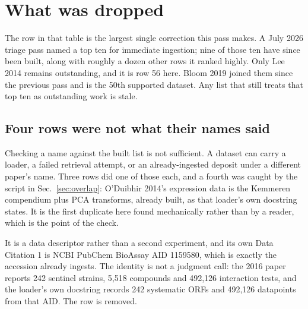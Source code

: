 
\section{What was dropped}\label{sec:excluded}



The  row in that table is the largest single correction this pass
makes. A July 2026 triage pass named a top ten for immediate ingestion; nine of those ten
have since been built, along with roughly a dozen other rows it ranked highly. Only Lee 2014
remains outstanding, and it is row 56 here. Bloom 2019 joined them since the previous
pass and is the 50th supported dataset. Any list that still treats that top ten as
outstanding work is stale.

\subsection{Four rows were not what their names said}\label{sec:status}

Checking a name against the built list is not sufficient. A dataset can carry a loader, a
failed retrieval attempt, or an already-ingested deposit under a different paper's name.
Three rows did one of those each, and a fourth was caught by the script in
Sec.~\ref{sec:overlap}: O'Duibhir 2014's expression data is the Kemmeren compendium plus
PCA transforms, already built, as that loader's own docstring states. It is the first
duplicate here found mechanically rather than by a reader, which is the point of the check.

 It is a data descriptor
rather than a second experiment, and its own Data Citation 1 is NCBI PubChem BioAssay AID
1159580, which is exactly the accession 
already ingests. The identity is not a judgment call: the 2016 paper reports 242 sentinel
strains, 5,518 compounds and 492,126 interaction tests, and the loader's own docstring
records 242 systematic ORFs and 492,126 datapoints from that AID. The row is removed.

